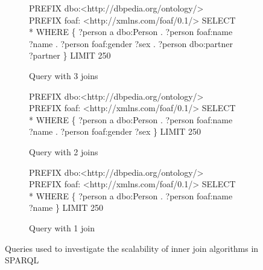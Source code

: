 \documentclass[10pt,a4paper]{article}
\begin{document}
\begin{figure}[h!]
		\begin{subfigure}{0.45\textwidth}
			\vspace{1em}
			\begin{algorithmic}
				\STATE PREFIX dbo:\textless http://dbpedia.org/ontology/\textgreater
				\STATE PREFIX foaf: \textless http://xmlns.com/foaf/0.1/\textgreater
				\STATE SELECT *
				\STATE WHERE \{
				\STATE 	?person a dbo:Person .
				\STATE 	?person foaf:name ?name .
				\STATE 	?person foaf:gender ?sex .
				\STATE 	?person dbo:partner ?partner
				\STATE \}
				\STATE LIMIT 250
			\end{algorithmic}
		\caption{Query with 3 joins}
		\end{subfigure}
		\begin{subfigure}{0.45\textwidth}
			\vspace{1em}
			\begin{algorithmic}
				\STATE PREFIX dbo:\textless http://dbpedia.org/ontology/\textgreater
				\STATE PREFIX foaf: \textless http://xmlns.com/foaf/0.1/\textgreater
				\STATE SELECT *
				\STATE WHERE \{
				\STATE 	?person a dbo:Person .
				\STATE 	?person foaf:name ?name .
				\STATE 	?person foaf:gender ?sex
				\STATE \}
				\STATE LIMIT 250
			\end{algorithmic}
		\caption{Query with 2 joins}
		\end{subfigure}
		\begin{subfigure}{0.45\textwidth}
			\vspace{1em}
			\begin{algorithmic}
				\STATE PREFIX dbo:\textless http://dbpedia.org/ontology/\textgreater
				\STATE PREFIX foaf: \textless http://xmlns.com/foaf/0.1/\textgreater
				\STATE SELECT *
				\STATE WHERE \{
				\STATE 	?person a dbo:Person .
				\STATE 	?person foaf:name ?name
				\STATE \}
				\STATE LIMIT 250
			\end{algorithmic}
			\caption{Query with 1 join}
		\end{subfigure}
		\caption{Queries used to investigate the scalability of inner join algorithms in SPARQL}
		\label{alg:inner_join}
	\end{figure}
	\vspace{-1em}
\end{document}
